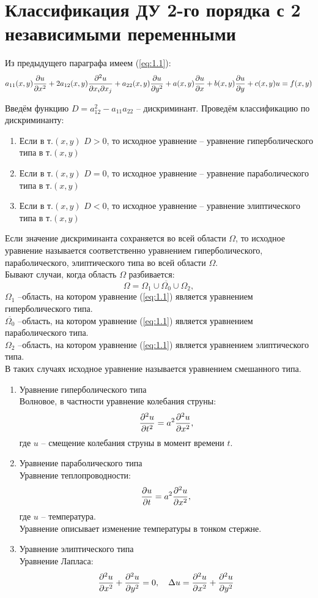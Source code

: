 \documentclass[../main.tex]{subfiles}
\begin{document}
\section{Классификация ДУ 2-го порядка с 2 независимыми переменными}
Из предыдущего параграфа имеем (\ref{eq:1.1}):
\[
	a_{11}(x,y)\frac{\partial u}{\partial x^2} + 2a_{12}(x,y)\frac{\partial ^2u}{\partial x_i \partial{x_j}} +
	a_{22}(x,y)\frac{\partial u}{\partial y^2} + a(x,y)\frac{\partial u}{\partial x} + b(x,y)\frac{\partial u}{\partial y} + c(x,y)u = f(x,y)
\]

Введём функцию $D = a_{12}^2-a_{11}a_{22}$ -- дискриминант.
Проведём классификацию по дискриминанту:
\begin{enumerate}
	\item
	      Если в т.$(x,y)$ $D>0$, то исходное уравнение --
	      уравнение гиперболического типа в т.$(x,y)$
	\item
	      Если в т.$(x,y)$ $D=0$, то исходное уравнение --
	      уравнение параболического типа в т.$(x,y)$
	\item
	      Если в т.$(x,y)$ $D<0$, то исходное уравнение --
	      уравнение элиптического типа в т.$(x,y)$
\end{enumerate}

Если значение дискриминанта сохраняется во всей области $\Omega$,
то исходное уравнение называется соответственно уравнением гиперболического,
параболического, элиптического типа во всей области $\Omega$.\\

Бывают случаи, когда область $\Omega$ разбивается:
\[\Omega = \Omega_1 \cup \overline{\Omega_0} \cup \Omega_2, \]
$\Omega_1$ --область, на котором уравнение (\ref{eq:1.1}) является уравнением гиперболического типа.\\
$\overline{\Omega_0}$ --область, на котором уравнение (\ref{eq:1.1}) является уравнением параболического типа.\\
$\Omega_2$ --область, на котором уравнение (\ref{eq:1.1}) является уравнением элиптического типа.\\
В таких случаях исходное уравнение называется уравнением смешанного типа.

\begin{enumerate}
	\item Уравнение гиперболического типа\\
	      Волновое, в частности уравнение колебания струны:
	      \[\frac{\partial ^2u}{\partial t^2}=a^2\frac{\partial ^2u}{\partial x^2},\]
	      где $u$ -- смещение колебания струны в момент времени $t$.
	\item Уравнение параболического типа\\
	      Уравнение теплопроводности:
	      \[\frac{\partial u}{\partial t}=a^2\frac{\partial ^2u}{\partial x^2},\]
	      где $u$ -- температура.\\
	      Уравнение описывает изменение температуры в тонком стержне.
	\item Уравнение элиптического типа\\
	      Уравнение Лапласа:
	      \[
		      \frac{\partial ^2u}{\partial x^2}+\frac{\partial ^2u}{\partial y^2} = 0,\quad
		      \Delta u=\frac{\partial ^2u}{\partial x^2}+\frac{\partial ^2u}{\partial y^2}
	      \]
\end{enumerate}
\end{document}

